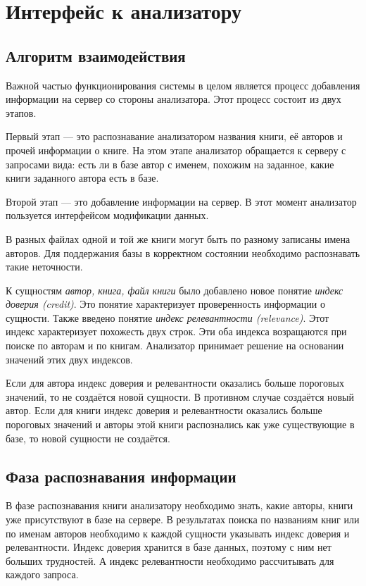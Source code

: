\section{Интерфейс к анализатору}


\subsection{Алгоритм взаимодействия}

Важной частью функционирования системы в целом является процесс добавления информации на сервер со стороны анализатора. Этот процесс состоит из двух этапов. 

Первый этап --- это распознавание анализатором названия книги, её авторов и прочей информации о книге. На этом этапе анализатор обращается к серверу с запросами вида: есть ли в базе автор с именем, похожим на заданное, какие книги заданного автора есть в базе.

Второй этап --- это добавление информации на сервер. В этот момент анализатор пользуется интерфейсом модификации данных.


В разных файлах одной и той же книги могут быть по разному записаны имена авторов. Для поддержания базы в корректном состоянии необходимо распознавать такие неточности.

К сущностям {\em автор, книга, файл книги} было добавлено новое понятие {\em индекс доверия (credit)}. Это понятие характеризует проверенность информации о сущности.
Также введено понятие {\em индекс релевантности (relevance)}. Этот индекс характеризует похожесть двух строк.
Эти оба индекса возращаются при поиске по авторам и по книгам.
Анализатор принимает решение на основании значений этих двух индексов.

Если для автора индекс доверия и релевантности оказались больше пороговых значений, то не создаётся новой сущности.
В противном случае создаётся новый автор.
Если для книги индекс доверия и релевантности оказались больше пороговых значений и авторы этой книги распознались как уже существующие в базе, то новой сущности не создаётся.

\subsection{Фаза распознавания информации}

В фазе распознавания книги анализатору необходимо знать, какие авторы, книги уже присутствуют в базе на сервере.
В результатах поиска по названиям книг или по именам авторов необходимо к каждой сущности указывать индекс доверия и релевантности.
Индекс доверия хранится в базе данных, поэтому с ним нет больших трудностей.
А индекс релевантности необходимо рассчитывать для каждого запроса.

